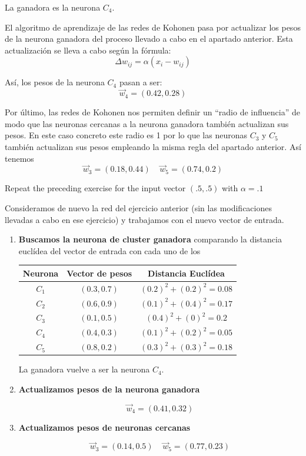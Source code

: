 \begin{problem}[2]
La ganadora es la neurona $C_4$.

\spart

El algoritmo de aprendizaje de las redes de Kohonen pasa por actualizar los pesos de la neurona ganadora del proceso llevado a cabo en el apartado anterior. Esta actualización se lleva a cabo según la fórmula:
\[Δw_{ij} = α(x_i-w_{ij})\]

Así, los pesos de la neurona $C_4$ pasan a ser:
\[\vec{w}_4 = (0.42, 0.28)\]

\spart

Por último, las redes de Kohonen nos permiten definir un ``radio de influencia'' de modo que las neuronas cercanas a la neurona ganadora también actualizan sus pesos. En este caso concreto este radio es 1 por lo que las neuronas $C_3$ y $C_5$ también actualizan sus pesos empleando la misma regla del apartado anterior. Así tenemos
\[\vec{w}_3 = (0.18,0.44) \;\;\;\; \vec{w}_5=(0.74,0.2)\]

\end{problem}

\begin{problem}[3]
Repeat the preceding exercise for the input vector $(.5,.5)$ with $α=.1$

\solution

Consideramos de nuevo la red del ejercicio anterior (sin las modificaciones llevadas a cabo en ese ejercicio) y trabajamos con el nuevo vector de entrada.

\begin{enumerate}
\item \textbf{Buscamos la neurona de cluster ganadora} comparando la distancia euclídea del vector de entrada con cada uno de los
\begin{center}
\begin{tabular}{|c|c|c|}
\hline
\textbf{Neurona}  & \textbf{Vector de pesos} & \textbf{Distancia Euclídea}\\
\hline
$C_1$ & $(0.3, 0.7)$ & $(0.2)^2 + (0.2)^2 = 0.08$\\
$C_2$ & $(0.6, 0.9)$ & $(0.1)^2 + (0.4)^2 =0.17$\\
$C_3$ & $(0.1, 0.5)$ & $(0.4)^2 + (0)^2 = 0.2$\\
$C_4$ & $(0.4, 0.3)$ & $(0.1)^2 + (0.2)^2 = 0.05$\\
$C_5$ & $(0.8, 0.2)$ & $(0.3)^2 + (0.3)^2 = 0.18$\\
\hline
\end{tabular}
\end{center}

La ganadora vuelve a ser la neurona $C_4$.

\item \textbf{Actualizamos pesos de la neurona ganadora}

\[\vec{w}_4 = (0.41,0.32)\]

\item \textbf{Actualizamos pesos de neuronas cercanas}

\[\vec{w}_3 = (0.14,0.5) \;\;\;\; \vec{w}_5 = (0.77,0.23) \]
\end{enumerate}


\end{problem}

